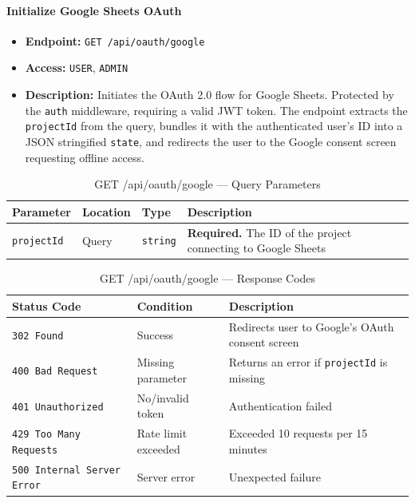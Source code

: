 \paragraph{Initialize Google Sheets OAuth}
\label{subsubsec:init-google-oauth}

\begin{itemize}
  \item \textbf{Endpoint:} \texttt{GET /api/oauth/google}
  \item \textbf{Access:} \texttt{USER}, \texttt{ADMIN}
  \item \textbf{Description:} Initiates the OAuth 2.0 flow for Google Sheets. 
  Protected by the \texttt{auth} middleware, requiring a valid JWT token. 
  The endpoint extracts the \texttt{projectId} from the query, bundles it with the authenticated user's ID into a JSON stringified \texttt{state}, and redirects the user to the Google consent screen requesting offline access.
\end{itemize}

\begin{table}[H]
\centering
\renewcommand{\arraystretch}{1.3}
\begin{tabularx}{\textwidth}{|l|l|l|X|}
\hline
\textbf{Parameter} & \textbf{Location} & \textbf{Type} & \textbf{Description} \\
\hline
\texttt{projectId} & Query & \texttt{string}  & \textbf{Required.} The ID of the project connecting to Google Sheets \\
\hline
\end{tabularx}
\caption{GET /api/oauth/google — Query Parameters}
\label{tab:init-google-oauth-params}
\end{table}

\begin{table}[H]
\centering
\renewcommand{\arraystretch}{1.3}
\begin{tabularx}{\textwidth}{|l|l|X|}
\hline
\textbf{Status Code} & \textbf{Condition} & \textbf{Description} \\
\hline
\texttt{302 Found}        & Success            & Redirects user to Google's OAuth consent screen \\
\hline
\texttt{400 Bad Request}  & Missing parameter  & Returns an error if \texttt{projectId} is missing \\
\hline
\texttt{401 Unauthorized} & No/invalid token   & Authentication failed \\
\hline
\texttt{429 Too Many Requests} & Rate limit exceeded & Exceeded 10 requests per 15 minutes \\
\hline
\texttt{500 Internal Server Error} & Server error & Unexpected failure \\
\hline
\end{tabularx}
\caption{GET /api/oauth/google — Response Codes}
\label{tab:init-google-oauth-responses}
\end{table}
\FloatBarrier


